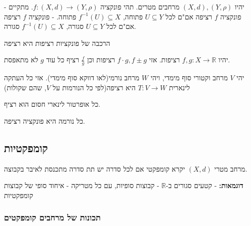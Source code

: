 \documentclass{tstextbook}
\begin{document}
\begin{proposition}
יהיו \((X,d),\left( Y,\rho \right)\) מרחבים מטרים. תהי פונקציה \(f:(X,d)\to\left( Y,\rho \right)\). מתקיים
- פונקציה \(f\) רציפה אם"ם לכל \(U\subseteq Y\) פתוחה, \(f^{-1}(U)\subseteq X\) פתוחה.
- פונקציה \(f\) רציפה אם"ם לכל \(U\subseteq Y\) סגורה, \(f^{-1}(U)\subseteq X\) סגורה.

\end{proposition}
\begin{proposition}
הרכבה של פונקציות רציפות היא רציפה

\end{proposition}
\begin{proposition}
יהיו \(f,g:X\to\mathbb{R}\) רציפות. אזי \(f\cdot g,f\pm g\) רציפות וכן \(\frac{f}{g}\) רציף כל עוד \(g\) לא מתאפסת.

\end{proposition}
\begin{proposition}
יהי \(V\) מרחב וקטורי סוף מימדי, ויהי \(W\) מרחב נורמי(לאו דווקא סוף מימדי). אזי כל העתקה לינארית \(T:V\to W\) היא רציפה(לפי כל הנורמות על \(V\), שהם שקולות)

\end{proposition}
\begin{proposition}
כל אופרטור לינארי חסום הוא רציף.

\end{proposition}
\begin{proposition}
כל נורמה היא פונקציה רציפה.

\end{proposition}
\subsection{קומפקטיות}

\begin{definition}
מרחב מטרי \((X,d)\) יקרא קומפקטי אם לכל סדרה יש תת סדרה מתכנסת לאיבר בקבוצה.

\end{definition}
\textbf{דוגמאות:}
- קטעים סגורים ב-\(\mathbb{R}\)
- קבוצות סופיות, עם כל מטריקה
- איחוד סופי של קבוצות קומפקטיות

\subsubsection{תכונות של מרחבים קומפקטים}
\end{document}
